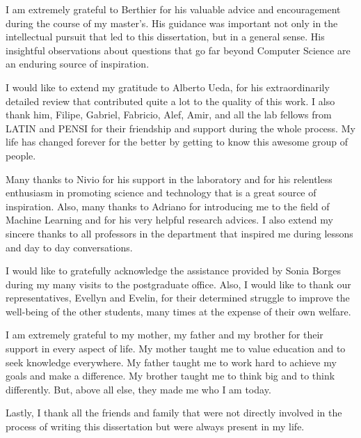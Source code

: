 I am extremely grateful to Berthier for his valuable advice
and encouragement during the course of my master's. His guidance was important not only
in the intellectual pursuit that led to this dissertation, but in a general
sense. His insightful observations about questions that go far beyond Computer Science
are an enduring source of inspiration. 

I would like to extend my gratitude to Alberto
Ueda, for his extraordinarily detailed review that contributed quite a lot to the quality 
of this work. I also thank him, Filipe, Gabriel, Fabricio, Alef, Amir, and all the lab
fellows from LATIN and PENSI for their friendship and support during the whole process.
My life has changed forever for the better by getting to know this awesome
group of people.

Many thanks to Nivio for his support in the laboratory and for his relentless enthusiasm 
in promoting science and technology that is a great source of inspiration. Also, many
thanks to Adriano for introducing me to the field of Machine Learning and for his very 
helpful research advices. I also extend my sincere thanks to all professors in the 
department that inspired me during lessons and day to day conversations.

I would like to gratefully acknowledge the assistance provided by Sonia Borges during
my many visits to the postgraduate office. Also, I would like to thank our
representatives, Evellyn and Evelin, for their determined struggle to improve the 
well-being of the other students, many times at the expense of their own welfare.

I am extremely grateful to my mother, my father and my brother for their support 
in every aspect of life. My mother taught me to value education and 
to seek knowledge everywhere. My father taught me to work hard 
to achieve my goals and make a difference. My brother taught me to think
big and to think differently. But, above all else, they made me who I am today.

Lastly, I thank all the friends and family that were not directly involved in the 
process of writing this dissertation but were always present in my life.
